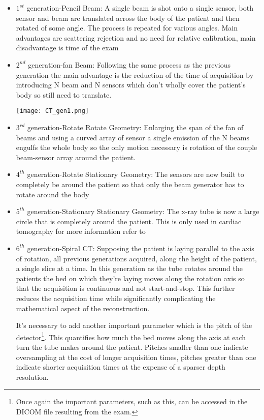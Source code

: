 \begin{itemize}
\item $1^{st}$ generation-Pencil Beam: A single beam is shot onto a single sensor, both sensor and beam are translated across the body of the patient and then rotated of some angle. The process is repeated for various angles. Main advantages are scattering rejection and no need for relative calibration, main disadvantage is time of the exam
\item $2^{nd}$ generation-fan Beam: Following the same process as the previous generation the main advantage is the reduction of the time of acquisition by introducing N beam and N sensors which don't wholly cover the patient's body so still need to translate.

\begin{minipage}{\linewidth}
            \centering
            \texttt{[image: CT\_gen1.png]}
        \end{minipage}

\item $3^{rd}$ generation-Rotate Rotate Geometry: Enlarging the span of the fan of beams and using a curved array of sensor a single emission of the N beams engulfs the whole body so the only motion necessary is rotation of the couple beam-sensor array around the patient.
\item $4^{th}$ generation-Rotate Stationary Geometry: The sensors are now built to completely be around the patient so that only the beam generator has to rotate around the body \newline
\item $5^{th}$ generation-Stationary Stationary Geometry: The x-ray tube is now a large circle that is completely around the patient. This is only used in cardiac tomography for more information refer to \cite{Cardiac-CT}
\item $6^{th}$ generation-Spiral CT: Supposing the patient is laying parallel to the axis of rotation, all previous generations acquired, along the height of the patient, a single slice at a time. In this generation as the tube rotates around the patients the bed on which they're laying moves along the rotation axis so that the acquisition is continuous and not start-and-stop. This further reduces the acquisition time while significantly complicating the mathematical aspect of the reconstruction. 

It's necessary to add another important parameter which is the pitch of the detector\footnote{Once again the important parameters, such as this, can be accessed in the DICOM file resulting from the exam.}. This quantifies how much the bed moves along the axis at each turn the tube makes around the patient. Pitches smaller than one indicate oversampling at the cost of longer acquisition times, pitches greater than one indicate shorter acquisition times at the expense of a sparser depth resolution.


\end{itemize}
